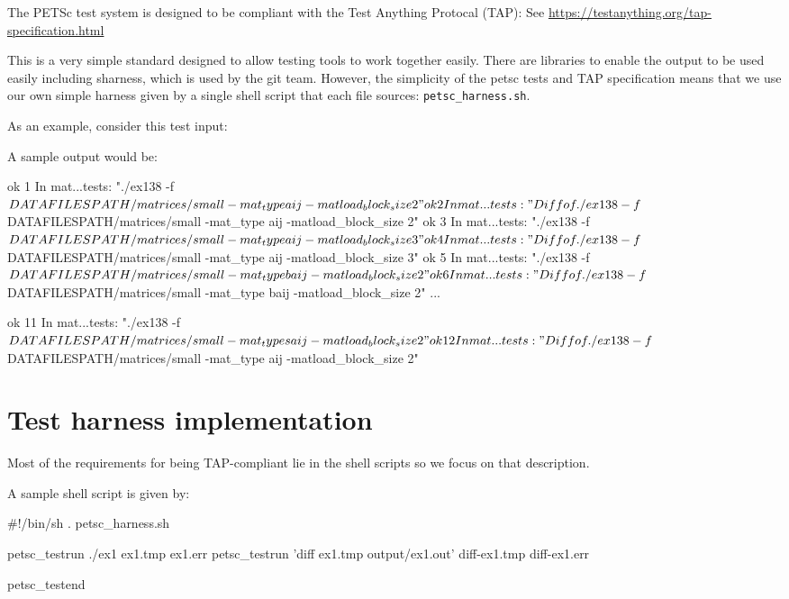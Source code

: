 The PETSc test system is designed to be compliant with the Test Anything
Protocal (TAP): See \url{https://testanything.org/tap-specification.html}

This is a very simple standard designed to allow testing tools to work
together easily.  There are libraries to enable the output to be used
easily including sharness, which is used by the git team.  However, the
simplicity of the petsc tests and TAP specification means that we use
our own simple harness given by a single shell script that each file
sources: \lstinline{petsc_harness.sh}.

As an example, consider this test input:
%

A sample output would be:
\begin{outputlisting}
      ok 1 In mat...tests: "./ex138 -f ${DATAFILESPATH}/matrices/small -mat_type aij -matload_block_size 2"
      ok 2 In mat...tests: "Diff of ./ex138 -f ${DATAFILESPATH}/matrices/small -mat_type aij -matload_block_size 2"
      ok 3 In mat...tests: "./ex138 -f ${DATAFILESPATH}/matrices/small -mat_type aij -matload_block_size 3"
      ok 4 In mat...tests: "Diff of ./ex138 -f ${DATAFILESPATH}/matrices/small -mat_type aij -matload_block_size 3"
      ok 5 In mat...tests: "./ex138 -f ${DATAFILESPATH}/matrices/small -mat_type baij -matload_block_size 2"
      ok 6 In mat...tests: "Diff of ./ex138 -f ${DATAFILESPATH}/matrices/small -mat_type baij -matload_block_size 2"
      ...

      ok 11 In mat...tests: "./ex138 -f ${DATAFILESPATH}/matrices/small -mat_type saij -matload_block_size 2"
      ok 12 In mat...tests: "Diff of ./ex138 -f ${DATAFILESPATH}/matrices/small -mat_type aij -matload_block_size 2"
\end{outputlisting}

\section{Test harness implementation%
  \label{test-harness-implementation}%
}

Most of the requirements for being TAP-compliant lie in the shell
scripts so we focus on that description.

A sample shell script is given by:
\begin{outputlisting}
#!/bin/sh
. petsc_harness.sh

petsc_testrun ./ex1 ex1.tmp ex1.err
petsc_testrun 'diff ex1.tmp output/ex1.out' diff-ex1.tmp diff-ex1.err

petsc_testend
\end{outputlisting}

